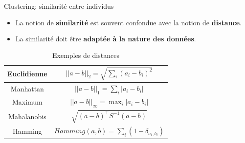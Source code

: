 \documentclass[hyperref={pdfpagelabels=false}]{beamer}
\begin{document}
    \begin{frame}{Clustering: similarité entre individus}
        \begin{itemize}
            \item La notion de \textbf{similarité} est souvent confondue avec la 
                notion de \textbf{distance}.
            \item La similarité doit être \textbf{adaptée à la nature des 
                données}.
        \end{itemize}

        \begin{table}[!h]
            \centering
               \begin{tabular}{cc}
               \hline
               Euclidienne & $ ||a - b ||_2  = \sqrt{ \sum_{i} (a_i - b_i)^2} $    \\	
               \hline
               Manhattan & $ ||a - b ||_1  = \sum_{i} |a_i - b_i|$    \\	
               \hline
               Maximum & $ ||a - b ||_{\infty}  = \mathop\mathrm{max}_{i} |a_i - b_i|$    \\	
               \hline 
               Mahalanobis & $ \sqrt{(a-b)^\top S^{-1}(a-b)}$    \\	
               \hline  
               Hamming & $ Hamming(a,b) = \sum_i  (1- \delta_{a_i,b_i}) $   \\	
               \hline           
               \end{tabular}
               \caption{Exemples de distances}
           \end{table}
    \end{frame}
\end{document}
